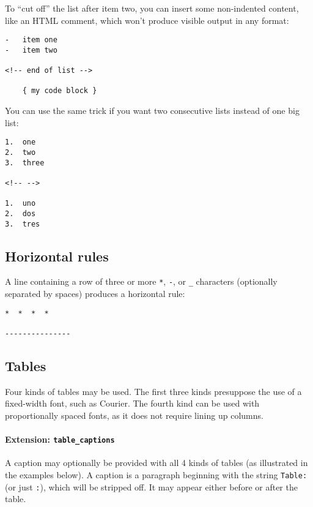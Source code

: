 \documentclass[]{article}
\let\oldparagraph\paragraph
\renewcommand{\paragraph}[1]{\oldparagraph{#1}\mbox{}}
\begin{document}
To ``cut off'' the list after item two, you can insert some non-indented
content, like an HTML comment, which won't produce visible output in any
format:

\begin{verbatim}
-   item one
-   item two

<!-- end of list -->

    { my code block }
\end{verbatim}

You can use the same trick if you want two consecutive lists instead of
one big list:

\begin{verbatim}
1.  one
2.  two
3.  three

<!-- -->

1.  uno
2.  dos
3.  tres
\end{verbatim}

\subsection{Horizontal rules}\label{horizontal-rules}

A line containing a row of three or more \texttt{*}, \texttt{-}, or
\texttt{\_} characters (optionally separated by spaces) produces a
horizontal rule:

\begin{verbatim}
*  *  *  *

---------------
\end{verbatim}

\hypertarget{tables}{\subsection{Tables}\label{tables}}

Four kinds of tables may be used. The first three kinds presuppose the
use of a fixed-width font, such as Courier. The fourth kind can be used
with proportionally spaced fonts, as it does not require lining up
columns.

\paragraph{\texorpdfstring{Extension:
\texttt{table\_captions}}{Extension: table\_captions}}\label{extension-table_captions}

A caption may optionally be provided with all 4 kinds of tables (as
illustrated in the examples below). A caption is a paragraph beginning
with the string \texttt{Table:} (or just \texttt{:}), which will be
stripped off. It may appear either before or after the table.
\end{document}
